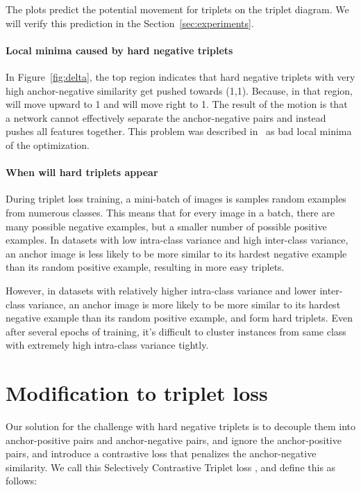 \documentclass[runningheads]{llncs}
\begin{document}
The plots predict the potential movement for triplets on the triplet diagram. We will verify this prediction in the Section~\ref{sec:experiments}. 

\paragraph{\bf{Local minima caused by hard negative triplets}}
In Figure~\ref{fig:delta},  the top region indicates that hard negative triplets with very high anchor-negative similarity get pushed towards (1,1). Because, in that region,  will move upward to 1 and  will move right to 1. The result of the motion is that a network cannot effectively separate the anchor-negative pairs and instead pushes all features together.  This problem was described in~\cite{xuan2019improved,facenet,faghri2018vse++,ge2019visual,SOP,wang2017train,yu2018correcting} as bad local minima of the optimization.

\paragraph{\bf{When will hard triplets appear}}
During triplet loss training, a mini-batch of images is samples random examples from numerous classes. This means that for every image in a batch, there are many possible negative examples, but a smaller number of possible positive examples. In datasets with low intra-class variance and high inter-class variance, an anchor image is less likely to be more similar to its hardest negative example than its random positive example, resulting in more easy triplets.

However, in datasets with relatively higher intra-class variance and lower inter-class variance, an anchor image is more likely to be more similar to its hardest negative example than its random positive example, and form hard triplets. Even after several epochs of training, it's difficult to cluster instances from same class with extremely high intra-class variance tightly.

\section{Modification to triplet loss}
Our solution for the challenge with hard negative triplets is to decouple them into anchor-positive pairs and anchor-negative pairs, and ignore the anchor-positive pairs, and introduce a contrastive loss that penalizes the  anchor-negative similarity. We call this Selectively Contrastive Triplet loss , and define this as follows:
\end{document}
